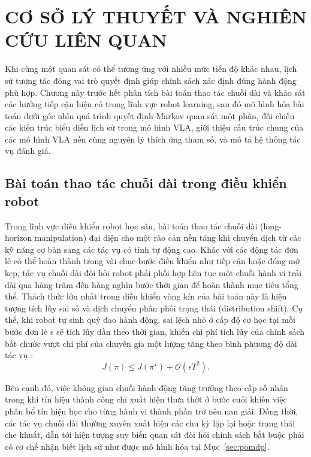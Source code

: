 \chapter{CƠ SỞ LÝ THUYẾT VÀ NGHIÊN CỨU LIÊN QUAN}

Khi cùng một quan sát có thể tương ứng với nhiều mức tiến độ khác nhau, lịch sử tương tác đóng vai trò quyết định giúp chính sách xác định đúng hành động phù hợp. Chương này trước hết phân tích bài toán thao tác chuỗi dài và khảo sát các hướng tiếp cận hiện có trong lĩnh vực robot learning, sau đó mô hình hóa bài toán dưới góc nhìn quá trình quyết định Markov quan sát một phần, đối chiếu các kiến trúc biểu diễn lịch sử trong mô hình VLA, giới thiệu cấu trúc chung của các mô hình VLA nền cùng nguyên lý thích ứng tham số, và mô tả hệ thống tác vụ đánh giá.

\section{Bài toán thao tác chuỗi dài trong điều khiển robot}

Trong lĩnh vực điều khiển robot học sâu, bài toán thao tác chuỗi dài (long-horizon manipulation) đại diện cho một rào cản nền tảng khi chuyển dịch từ các kỹ năng cơ bản sang các tác vụ có tính tự động cao. Khác với các động tác đơn lẻ có thể hoàn thành trong vài chục bước điều khiển như tiếp cận hoặc đóng mở kẹp, tác vụ chuỗi dài đòi hỏi robot phải phối hợp liên tục một chuỗi hành vi trải dài qua hàng trăm đến hàng nghìn bước thời gian để hoàn thành mục tiêu tổng thể. Thách thức lớn nhất trong điều khiển vòng kín của bài toán này là hiện tượng tích lũy sai số và dịch chuyển phân phối trạng thái (distribution shift). Cụ thể, khi robot tự sinh quỹ đạo hành động, sai lệch nhỏ ở cấp độ cơ học tại mỗi bước đơn lẻ $\epsilon$ sẽ tích lũy dần theo thời gian, khiến chi phí tích lũy của chính sách bắt chước vượt chi phí của chuyên gia một lượng tăng theo bình phương độ dài tác vụ \cite{ross2010dagger}:
\begin{equation}
J(\pi) \le J(\pi^\star) + \mathcal{O}(\epsilon T^2).
\label{eq:compounding-error}
\end{equation}

Bên cạnh đó, việc không gian chuỗi hành động tăng trưởng theo cấp số nhân trong khi tín hiệu thành công chỉ xuất hiện thưa thớt ở bước cuối khiến việc phân bổ tín hiệu học cho từng hành vi thành phần trở nên nan giải. Đồng thời, các tác vụ chuỗi dài thường xuyên xuất hiện các chu kỳ lặp lại hoặc trạng thái che khuất, dẫn tới hiện tượng suy biến quan sát đòi hỏi chính sách bắt buộc phải có cơ chế nhận biết lịch sử như được mô hình hóa tại Mục~\ref{sec:pomdp}.

